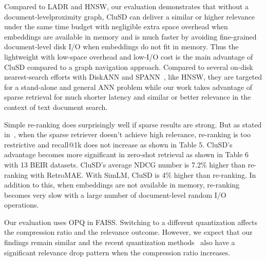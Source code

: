 
Compared to LADR and HNSW, our evaluation demonstrates that without a document-levelproximity graph, CluSD can 
deliver a similar or higher 
relevance under the same time budget
with negligible extra space overhead when embeddings are available in memory  and  is  much faster by avoiding fine-grained document-level disk I/O
when embeddings do not fit in  memory.  
Thus the lightweight with low-space overhead  and low-I/O cost is the main advantage of CluSD compared to a graph navigation approach.
Compared to several on-disk nearest-search efforts  with DiskANN and SPANN~\cite{NEURIPS2019_DiskANN,2023Web-Filtered-DiskANN},
like HNSW, they are targeted for a stand-alone and general ANN problem while our
work takes advantage of sparse retrieval for much shorter latency and similar or better relevance in the context of text document search.

Simple re-ranking does surprisingly well if sparse results are strong. But as stated in~\cite{2022CIKM-MacAvaneyGraphReRank,2023SIGIR-LADR},
when the sparse retriever doesn’t achieve high relevance, re-ranking is too 
restrictive and recall@1k does not increase as shown in Table 5. 
CluSD’s advantage becomes more significant in zero-shot retrieval as shown in Table 6 with 13 BEIR datasets. CluSD’s average NDCG number is 
7.2\% higher than re-ranking with RetroMAE. With SimLM, CluSD is 4\% higher than re-ranking.
In addition to this, when embeddings are not available in memory, re-ranking becomes very slow with a large number of document-level random I/O operations. 

Our evaluation uses OPQ in FAISS. 
Switching to a different quantization affects the compression ratio and  the relevance outcome. 
However, we expect that our findings remain similar and  the recent  quantization 
methods~\cite{2021CIKM-JPQ-Zhan,  2022WSDM-Zhan-RepCONC, Xiao2022Distill-VQ}
also have  a significant relevance drop pattern when the compression ratio increases.
\comments{
}

